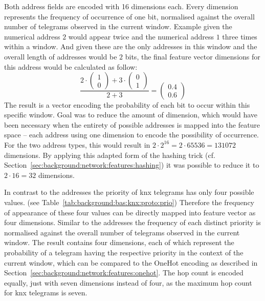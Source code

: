 Both address fields are encoded with 16 dimensions each. Every dimension represents the frequency of occurrence of one bit, normalised against the overall number of telegrams observed in the current window.
Example given the numerical address $2$ would appear twice and the numerical address $1$ three times within a window. And given these are the only addresses in this window and the overall length of addresses would be $2$ bits, the final feature vector dimensions for this address would be calculated as follow:
\[
\dfrac{2 \cdot \begin{pmatrix}1 \\ 0\end{pmatrix} + 3 \cdot \begin{pmatrix}0 \\ 1\end{pmatrix}}{2 + 3} = \begin{pmatrix}0.4 \\ 0.6\end{pmatrix}
\]
The result is a vector encoding the probability of each bit to occur within this specific window.
Goal was to reduce the amount of dimension, which would have been necessary when the entirety of possible addresses is mapped into the feature space -- each address using one dimension to encode the possibility of occurrence.
For the two address types, this would result in $2 \cdot 2^{16} = 2 \cdot 65536 = 131072$ dimensions. By applying this adapted form of the hashing trick (cf. Section~\ref{sec:background:network:features:hashing}) it was possible to reduce it to $2 \cdot 16 = 32$ dimensions.

In contrast to the addresses the priority of \gls{knx} telegrams has only four possible values. (see Table~\ref{tab:background:bas:knx:proto:prio}) Therefore the frequency of appearance of these four values can be directly mapped into feature vector as four dimensions. Similar to the addresses the frequency of each distinct priority is normalised against the overall number of telegrams observed in the current window.
The result contains four dimensions, each of which represent the probability of a telegram having the respective priority in the context of the current window, which can be compared to the OneHot encoding as described in Section~\ref{sec:background:network:features:onehot}.
The hop count is encoded equally, just with seven dimensions instead of four, as the maximum hop count for \gls{knx} telegrams is seven.

